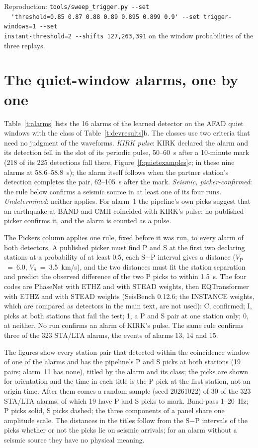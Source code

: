 \documentclass[11pt,a4paper]{article}
\newcommand{\stalta}{STA/LTA}
\newcommand{\VP}{$V_\mathrm{P}$}
\newcommand{\VS}{$V_\mathrm{S}$}
\newcommand{\tool}[1]{\nolinkurl{#1}}
\begin{document}
\noindent Reproduction: \tool{tools/sweep_trigger.py --set
  'threshold=0.85 0.87 0.88 0.89 0.895 0.899 0.9' --set trigger-windows=1 --set
instant-threshold=2 --shifts 127,263,391} on the window probabilities of the
three replays.

\clearpage
\section{The quiet-window alarms, one by one}\label{s:waveforms}

Table~\ref{t:alarms} lists the 16 alarms of the learned detector on the AFAD
quiet windows with the class of Table~\ref{t:devresults}b. The classes use two criteria
that need no judgment of the waveforms. \emph{KIRK pulse}: KIRK declared the
alarm and its detection fell in the slot of its periodic pulse, 50--60~s after a
10-minute mark (218 of its 225 detections fall there, Figure~\ref{f:quietexamples}c; in
these nine alarms at 58.6--58.8~s); the alarm itself follows when the partner
station's detection completes the pair, 62--105~s after the mark.
\emph{Seismic, picker-confirmed}: the rule below confirms a seismic source in at
least one of its four runs. \emph{Undetermined}: neither applies. For alarm~1 the
pipeline's own picks suggest that an earthquake at BAND and CMH coincided with
KIRK's pulse; no published picker confirms it, and the alarm is counted as a
pulse.

The Pickers column applies one rule, fixed before it was run, to every alarm of both detectors. A published picker must find P and S at the first two declaring
stations at a probability of at least 0.5, each S$-$P interval gives a distance (\VP{}~=~6.0, \VS{}~=~3.5~km/s), and the two distances must fit the station
separation and predict the observed difference of the two P picks to within
1.5~s. The four codes are PhaseNet with ETHZ and with STEAD weights, then
EQTransformer with ETHZ and with STEAD weights (SeisBench 0.12.6; the INSTANCE
weights, which are compared as detectors in the main text, are not used):
C, confirmed; I, picks at both stations that fail the test; 1, a P and S pair at
one station only; 0, at neither. No run confirms an alarm of KIRK's pulse. The
same rule confirms three of the 323 \stalta{} alarms, the events of alarms 13,
14 and 15.

The figures show every station pair that detected within the coincidence window
of one of the alarms and has the pipeline's P and S picks at both stations (19
pairs; alarm~11 has none), titled by the alarm and its class; the picks are shown
for orientation and the time in each title is the P pick at the first station,
not an origin time. After them comes a random sample (seed 20261022) of 30 of the
323 \stalta{} alarms, of which 19 have P and S picks to mark. Band-pass
1--20~Hz; P picks solid, S picks dashed; the three components of a panel share one
amplitude scale. The distances in the titles follow from the S$-$P intervals of
the picks whether or not the picks lie on seismic arrivals; for an alarm without a
seismic source they have no physical meaning.
\end{document}
